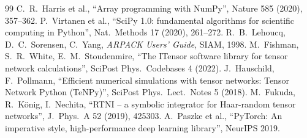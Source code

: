 \documentclass[11pt]{article}
\begin{document}
{\begin{thebibliography}{99}
 C.~R.~Harris et al., ``Array programming with NumPy'', Nature 585 (2020), 357--362.
 P.~Virtanen et al., ``SciPy 1.0: fundamental algorithms for scientific computing in Python'',
  Nat.\ Methods 17 (2020), 261--272.
 R.~B.~Lehoucq, D.~C.~Sorensen, C.~Yang, \emph{ARPACK Users' Guide}, SIAM, 1998.
 M.~Fishman, S.~R.~White, E.~M.~Stoudenmire, ``The ITensor software library for tensor network
  calculations'', SciPost Phys.\ Codebases 4 (2022).
 J.~Hauschild, F.~Pollmann, ``Efficient numerical simulations with tensor networks: Tensor
  Network Python (TeNPy)'', SciPost Phys.\ Lect.\ Notes 5 (2018).
 M.~Fukuda, R.~K\"onig, I.~Nechita, ``RTNI -- a symbolic integrator for Haar-random tensor
  networks'', J.\ Phys.\ A 52 (2019), 425303.
 A.~Paszke et al., ``PyTorch: An imperative style, high-performance deep learning
  library'', NeurIPS 2019.
\end{thebibliography}
}
\end{document}
